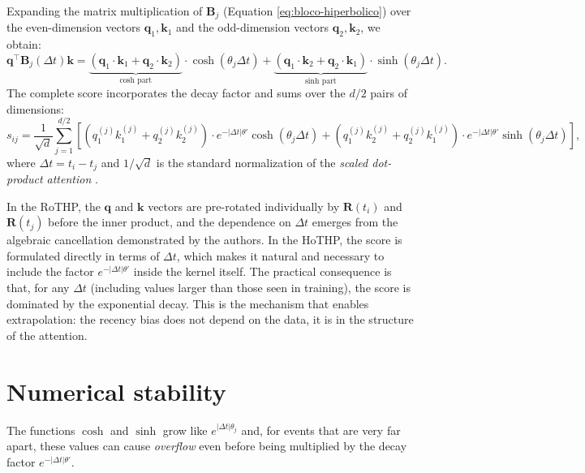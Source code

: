 Expanding the matrix multiplication of $\mathbf{B}_j$ (Equation \eqref{eq:bloco-hiperbolico}) over the even-dimension vectors $\mathbf{q}_1, \mathbf{k}_1$ and the odd-dimension vectors $\mathbf{q}_2, \mathbf{k}_2$, we obtain:
%
\begin{equation}
    \mathbf{q}^\top \mathbf{B}_j(\Delta t) \mathbf{k}
    = \underbrace{(\mathbf{q}_1 \cdot \mathbf{k}_1 + \mathbf{q}_2 \cdot \mathbf{k}_2)}_{\text{cosh part}} \cdot \cosh(\theta_j \Delta t)
    + \underbrace{(\mathbf{q}_1 \cdot \mathbf{k}_2 + \mathbf{q}_2 \cdot \mathbf{k}_1)}_{\text{sinh part}} \cdot \sinh(\theta_j \Delta t).
    \label{eq:score-par-dimensoes}
\end{equation}
%
The complete score incorporates the decay factor and sums over the $d/2$ pairs of dimensions:
%
\begin{equation}
    s_{ij} = \frac{1}{\sqrt{d}} \sum_{j=1}^{d/2}
    \left[
        (q_{1}^{(j)} k_{1}^{(j)} + q_{2}^{(j)} k_{2}^{(j)}) \cdot e^{-|\Delta t|\theta'} \cosh(\theta_j \Delta t)
        + (q_{1}^{(j)} k_{2}^{(j)} + q_{2}^{(j)} k_{1}^{(j)}) \cdot e^{-|\Delta t|\theta'} \sinh(\theta_j \Delta t)
    \right],
    \label{eq:score-hothp-completo}
\end{equation}
%
where $\Delta t = t_i - t_j$ and $1/\sqrt{d}$ is the standard normalization of the \textit{scaled dot-product attention} \cite{vaswani_attention_2017}.

In the RoTHP, the $\mathbf{q}$ and $\mathbf{k}$ vectors are pre-rotated individually by $\mathbf{R}(t_i)$ and $\mathbf{R}(t_j)$ before the inner product, and the dependence on $\Delta t$ emerges from the algebraic cancellation demonstrated by the authors. In the HoTHP, the score is formulated directly in terms of $\Delta t$, which makes it natural and necessary to include the factor $e^{-|\Delta t|\theta'}$ inside the kernel itself. The practical consequence is that, for any $\Delta t$ (including values larger than those seen in training), the score is dominated by the exponential decay. This is the mechanism that enables extrapolation: the recency bias does not depend on the data, it is in the structure of the attention.

\section{Numerical stability}
\label{sec:estabilidade-numerica}

The functions $\cosh$ and $\sinh$ grow like $e^{|\Delta t|\theta_j}$ and, for events that are very far apart, these values can cause \textit{overflow} even before being multiplied by the decay factor $e^{-|\Delta t|\theta'}$.

